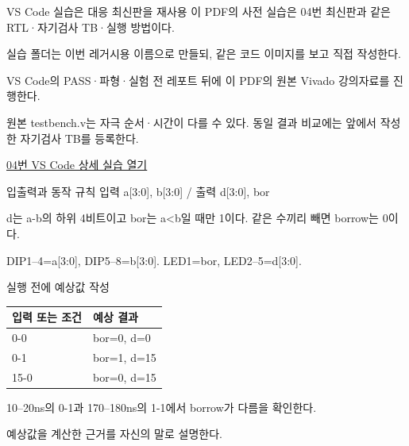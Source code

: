 \begin{frame}{VS Code 실습은 대응 최신판을 재사용}\relax
\small
이 PDF의 사전 실습은 04번 최신판과 같은 RTL·자기검사 TB·실행 방법이다.\par\vspace{0.22cm}실습 폴더는 이번 레거시용 이름으로 만들되, 같은 코드 이미지를 보고 직접 작성한다.\par\vspace{0.22cm}VS Code의 PASS·파형·실험 전 레포트 뒤에 이 PDF의 원본 Vivado 강의자료를 진행한다.\par\vspace{0.22cm}원본 testbench.v는 자극 순서·시간이 다를 수 있다. 동일 결과 비교에는 앞에서 작성한 자기검사 TB를 등록한다.\par\href{04.LAB1_04_SUBTRACTOR4_VIVADO.pdf}{04번 VS Code 상세 실습 열기}
\end{frame}

\begin{frame}[label=legacy-04-sim]{입출력과 동작 규칙}\relax
\small
입력 a[3:0], b[3:0] / 출력 d[3:0], bor\par\vspace{0.22cm}d는 a-b의 하위 4비트이고 bor는 a<b일 때만 1이다. 같은 수끼리 빼면 borrow는 0이다.\par\vspace{0.22cm}DIP1–4=a[3:0], DIP5–8=b[3:0]. LED1=bor, LED2–5=d[3:0].\par
\end{frame}

\begin{frame}{실행 전에 예상값 작성}\relax
\small
\begin{center}\renewcommand{\arraystretch}{1.45}
\begin{tabular}{l|l}
입력 또는 조건 & 예상 결과\\\hline
0-0 & bor=0, d=0\\
0-1 & bor=1, d=15\\
15-0 & bor=0, d=15\\
\end{tabular}\end{center}
10–20ns의 0-1과 170–180ns의 1-1에서 borrow가 다름을 확인한다.\par\vspace{0.22cm}예상값을 계산한 근거를 자신의 말로 설명한다.\par
\end{frame}

